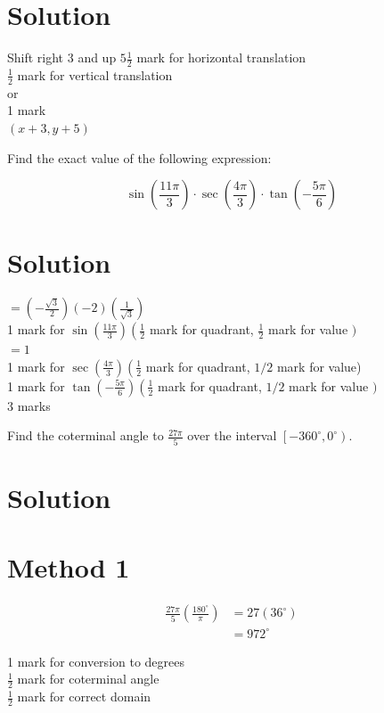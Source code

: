 \documentclass[10pt]{article}
\begin{document}
\section*{Solution}
Shift right 3 and up $5 \frac{1}{2}$ mark for horizontal translation\\
$\frac{1}{2}$ mark for vertical translation\\
or\\
1 mark\\
$(x+3, y+5)$

Find the exact value of the following expression:

$$
\sin \left(\frac{11 \pi}{3}\right) \cdot \sec \left(\frac{4 \pi}{3}\right) \cdot \tan \left(-\frac{5 \pi}{6}\right)
$$

\section*{Solution}
$=\left(-\frac{\sqrt{3}}{2}\right)(-2)\left(\frac{1}{\sqrt{3}}\right)$\\
1 mark for $\sin \left(\frac{11 \pi}{3}\right)\left(\frac{1}{2}\right.$ mark for quadrant, $\frac{1}{2}$ mark for value $)$\\
$=1$\\
1 mark for $\sec \left(\frac{4 \pi}{3}\right)\left(\frac{1}{2}\right.$ mark for quadrant, $1 / 2$ mark for value)\\
1 mark for $\tan \left(-\frac{5 \pi}{6}\right)\left(\frac{1}{2}\right.$ mark for quadrant, $1 / 2$ mark for value $)$\\
3 marks

Find the coterminal angle to $\frac{27 \pi}{5}$ over the interval $\left[-360^{\circ}, 0^{\circ}\right)$.

\section*{Solution}
\section*{Method 1}
$$
\begin{aligned}
\frac{27 \pi}{5}\left(\frac{180^{\circ}}{\pi}\right) & =27\left(36^{\circ}\right) \\
& =972^{\circ}
\end{aligned}
$$

1 mark for conversion to degrees\\
$\frac{1}{2}$ mark for coterminal angle\\
$\frac{1}{2}$ mark for correct domain
\end{document}
